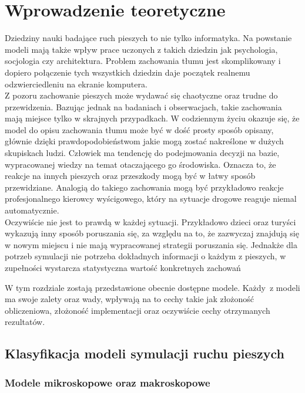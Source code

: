 \chapter{Wprowadzenie teoretyczne}
\label{cha:wprowadzenieTeoretyczne}

Dziedziny nauki badające ruch pieszych to nie tylko informatyka. Na powstanie modeli mają także wpływ prace uczonych z takich dziedzin jak psychologia, socjologia czy architektura. Problem zachowania tłumu jest skomplikowany i dopiero połączenie tych wszystkich dziedzin daje początek realnemu odzwierciedleniu na ekranie komputera. \\
Z pozoru zachowanie pieszych może wydawać się chaotyczne oraz trudne do przewidzenia. Bazując jednak na badaniach i obserwacjach, takie zachowania mają miejsce tylko w skrajnych przypadkach. W codziennym życiu okazuje się, że model do opisu zachowania tłumu może być w dość prosty sposób opisany, głównie dzięki prawdopodobieństwom jakie mogą zostać nakreślone w dużych skupiskach ludzi. Człowiek ma tendencję do podejmowania decyzji na bazie, wypracowanej wiedzy na temat otaczającego go środowiska. Oznacza to, że reakcje na innych pieszych oraz przeszkody mogą być w łatwy sposób przewidziane. Analogią do takiego zachowania mogą być przykładowo reakcje profesjonalnego kierowcy wyścigowego, który na sytuacje drogowe reaguje niemal automatycznie.\\
Oczywiście nie jest to prawdą w każdej sytuacji. Przykładowo dzieci oraz turyści wykazują inny sposób poruszania się, za względu na to, że zazwyczaj znajdują się w nowym miejscu i nie mają wypracowanej strategii poruszania się. Jednakże dla potrzeb symulacji nie potrzeba dokładnych informacji o każdym z pieszych, w zupełności wystarcza statystyczna wartość konkretnych zachowań

W tym rozdziale zostają przedstawione obecnie dostępne modele. Każdy~z modeli ma swoje zalety oraz wady, wpływają na to cechy takie jak złożoność obliczeniowa, złożoność implementacji oraz oczywiście cechy otrzymanych rezultatów.

\section{Klasyfikacja modeli symulacji ruchu pieszych}
\label{sec:klasyfikacja}

\subsection{Modele mikroskopowe oraz makroskopowe}

